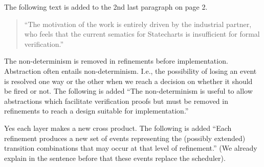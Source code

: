 \documentclass{response}
\begin{document}
\begin{response}
The following text is added to the 2nd last paragraph on page 2.
\begin{quote}
  ``The motivation of the work is entirely driven by the industrial partner, who feels that the current sematics for Statecharts is insufficient for formal verification.''
\end{quote}
\end{response}

\begin{comment}{Reviewer \#2}
  The current semantics is one of non-determinism as to which events
  will fire in a given microstep.  While this allows refinement, it
  does not admit a deterministic execution strategy, which means that
  it is not currently useful for generation of implementations.  In
  addition, it appears that it is possible that events can be "lost"
  and the system may choose not to execute them.  The authors must
  provide additional justification that this is a sensible semantics;
  I suspect that it will be surprising to most users who are familiar
  with StateCharts.  
 \end{comment}
  
  \begin{response}
    The non-determinism is removed in refinements before implementation. Abstraction often entails non-determinism.
    I.e., the possibility of losing an event is resolved one way or the other when we reach a decision on whether it should be fired or not.
    The following is added ``The non-determinism is useful to allow abstractions which facilitate verification proofs but must be removed in refinements to reach a design suitable for implementation.''
  \end{response}

\begin{comment}{Reviewer \#2}  
  When adding transitions at lower layers, it was
  not clear to me how these new transitions fit into the cross-product
  translation used to determine which set of transitions would fire.
  Perhaps this is handled layer-by-layer, but then each layer would
  need a scheduler and this was not discussed.   
\end{comment}

\begin{response}
	Yes each layer makes a new cross product. 
	The following is added ``Each refinement produces a new set of events representing the (possibly extended) transition combinations that may occur at that level of refinement.''
	(We already explain in the sentence before that these events replace the scheduler).
\end{response}
\end{document}
